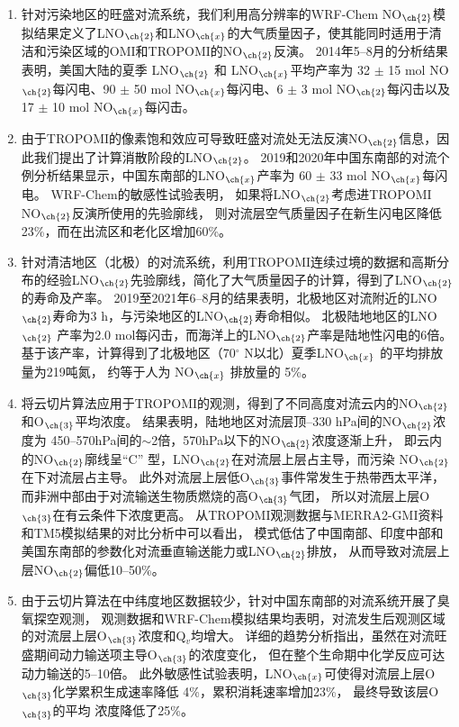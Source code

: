 \begin{enumerate}[label=（\arabic*）, labelindent=\parindent, nosep, leftmargin=0pt, widest=0, itemindent=*, topsep=0pt, partopsep=0pt, parsep=0pt]

\item 针对污染地区的旺盛对流系统，我们利用高分辨率的WRF-Chem NO$_{\ch{2}}$模拟结果定义了LNO$_{\ch{2}}$和LNO$_{\ch{x}}$的大气质量因子，使其能同时适用于清洁和污染区域的OMI和TROPOMI的NO$_{\ch{2}}$反演。
2014年5--8月的分析结果表明，美国大陆的夏季 LNO$_{\ch{2}}$ 和 LNO$_{\ch{x}}$平均产率为
32 $\pm$ 15 mol NO$_{\ch{2}}$每闪电、90 $\pm$ 50 mol NO$_{\ch{x}}$每闪电、6 $\pm$ 3 mol NO$_{\ch{2}}$每闪击以及17 $\pm$ 10 mol NO$_{\ch{x}}$每闪击。

\item 由于TROPOMI的像素饱和效应可导致旺盛对流处无法反演NO$_{\ch{2}}$信息，因此我们提出了计算消散阶段的LNO$_{\ch{2}}$。
2019和2020年中国东南部的对流个例分析结果显示，中国东南部的LNO$_{\ch{x}}$产率为 60 $\pm$ 33 mol NO$_{\ch{x}}$每闪电。
WRF-Chem的敏感性试验表明，
如果将LNO$_{\ch{2}}$考虑进TROPOMI NO$_{\ch{2}}$反演所使用的先验廓线，
则对流层空气质量因子在新生闪电区降低23\%，而在出流区和老化区增加60\%。

\item 针对清洁地区（北极）的对流系统，利用TROPOMI连续过境的数据和高斯分布的经验LNO$_{\ch{2}}$先验廓线，简化了大气质量因子的计算，得到了LNO$_{\ch{2}}$的寿命及产率。
2019至2021年6--8月的结果表明，北极地区对流附近的LNO$_{\ch{2}}$寿命为3 h，与污染地区的LNO$_{\ch{2}}$寿命相似。
北极陆地地区的LNO$_{\ch{2}}$ 产率为2.0 mol每闪击，而海洋上的LNO$_{\ch{2}}$产率是陆地性闪电的6倍。
基于该产率，计算得到了北极地区（70$^{\circ}$ N以北）夏季LNO$_{\ch{x}}$ 的平均排放量为219吨氮，
约等于人为 NO$_{\ch{x}}$ 排放量的 5\%。

\item 将云切片算法应用于TROPOMI的观测，得到了不同高度对流云内的NO$_{\ch{2}}$和O$_{\ch{3}}$平均浓度。
结果表明，陆地地区对流层顶--330 hPa间的NO$_{\ch{2}}$浓度为 450--570hPa间的$\sim$2倍，570hPa以下的NO$_{\ch{2}}$浓度逐渐上升，
即云内的NO$_{\ch{2}}$廓线呈“C” 型，LNO$_{\ch{2}}$在对流层上层占主导，而污染 NO$_{\ch{2}}$ 在下对流层占主导。
此外对流层上层低O$_{\ch{3}}$事件常发生于热带西太平洋，
而非洲中部由于对流输送生物质燃烧的高O$_{\ch{3}}$气团，
所以对流层上层O$_{\ch{3}}$在有云条件下浓度更高。
从TROPOMI观测数据与MERRA2-GMI资料和TM5模拟结果的对比分析中可以看出，
模式低估了中国南部、印度中部和美国东南部的参数化对流垂直输送能力或LNO$_{\ch{2}}$排放，
从而导致对流层上层NO$_{\ch{2}}$偏低10--50\%。

\item 由于云切片算法在中纬度地区数据较少，针对中国东南部的对流系统开展了臭氧探空观测，
观测数据和WRF-Chem模拟结果均表明，对流发生后观测区域的对流层上层O$_{\ch{3}}$浓度和Q$_v$均增大。
详细的趋势分析指出，虽然在对流旺盛期间动力输送项主导O$_{\ch{3}}$的浓度变化，
但在整个生命期中化学反应可达动力输送的5--10倍。
此外敏感性试验表明，LNO$_{\ch{x}}$可使得对流层上层O$_{\ch{3}}$化学累积生成速率降低 4\%，累积消耗速率增加23\%，
最终导致该层O$_{\ch{3}}$的平均 浓度降低了25\%。


\end{enumerate}
